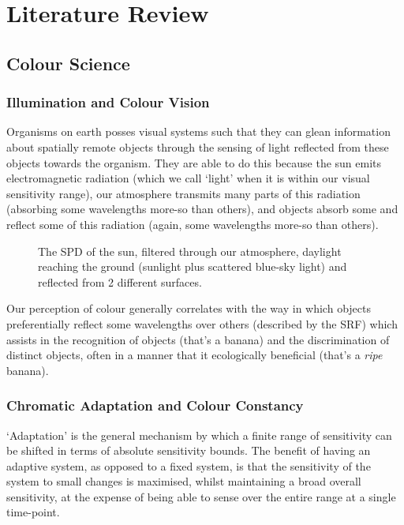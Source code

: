 \chapter{Literature Review}
\label{LitReview}

\section{Colour Science}

\subsection{Illumination and Colour Vision}

Organisms on earth posses visual systems such that they can glean information about spatially remote objects through the sensing of light reflected from these objects towards the organism. They are able to do this because the sun emits electromagnetic radiation (which we call `light' when it is within our visual sensitivity range), our atmosphere transmits many parts of this radiation (absorbing some wavelengths more-so than others), and objects absorb some and reflect some of this radiation (again, some wavelengths more-so than others).

\begin{figure}[htbp]
\caption{The \gls{SPD} of the sun, filtered through our atmosphere, daylight reaching the ground (sunlight plus scattered blue-sky light) and reflected from 2 different surfaces.}
\label{fig:SPD}
\end{figure}

Our perception of colour generally correlates with the way in which objects preferentially reflect some wavelengths over others (described by the \acrfull{SRF}) which assists in the recognition of objects (that's a banana) and the discrimination of distinct objects, often in a manner that it ecologically beneficial (that's a \emph{ripe} banana).

\subsection{Chromatic Adaptation and Colour Constancy}
`Adaptation' is the general mechanism by which a finite range of sensitivity can be shifted in terms of absolute sensitivity bounds. The benefit of having an adaptive system, as opposed to a fixed system, is that the sensitivity of the system to small changes is maximised, whilst maintaining a broad overall sensitivity, at the expense of being able to sense over the entire range at a single time-point. 

